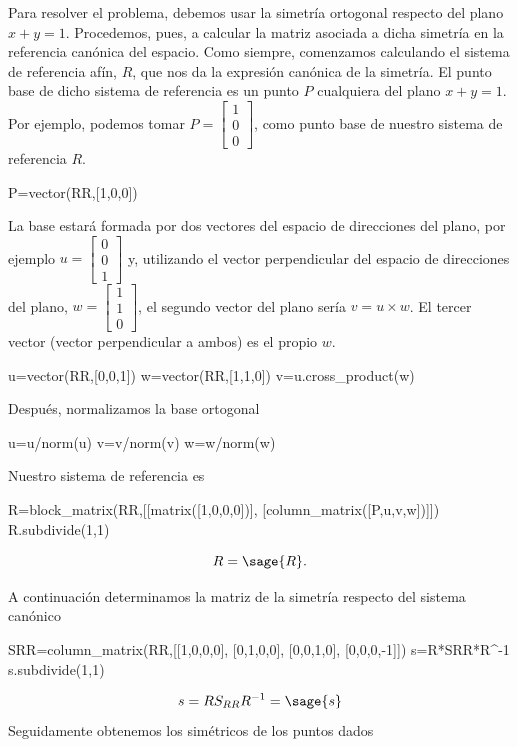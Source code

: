\documentclass{amsart}
\begin{document}
Para resolver el problema, debemos usar la simetría ortogonal respecto del plano  $x+y=1$. Procedemos, pues, a calcular la matriz asociada a dicha simetría en la referencia canónica del espacio. Como siempre, comenzamos calculando el sistema de referencia afín, $R$, que nos da la expresión canónica de la simetría. El punto base de dicho sistema de referencia es un punto $P$ cualquiera del plano $x+y=1$. Por ejemplo, podemos tomar  $P = \left[\begin{array}{c}1\\0\\0
\end{array}\right]$, como punto base de nuestro sistema de referencia $R$.
\begin{sageblock}
P=vector(RR,[1,0,0])
\end{sageblock}
La base estará formada por dos vectores del espacio de direcciones del plano, por ejemplo $u = \left[\begin{array}{c}0\\0\\1
\end{array}\right]$ y, utilizando el vector perpendicular del espacio de direcciones del plano, $w = \left[\begin{array}{c}1\\1\\0 \end{array}\right]$, el segundo vector del plano sería $v=u\times w $. El tercer vector (vector perpendicular a ambos) es el propio $w$. 
\begin{sageblock}
u=vector(RR,[0,0,1])
w=vector(RR,[1,1,0])
v=u.cross_product(w)
\end{sageblock}
Después, normalizamos la base ortogonal
\begin{sageblock}
u=u/norm(u)
v=v/norm(v)
w=w/norm(w)
\end{sageblock}
Nuestro sistema de referencia es
\begin{sageblock}
R=block_matrix(RR,[[matrix([1,0,0,0])],
                  [column_matrix([P,u,v,w])]])
R.subdivide(1,1)
\end{sageblock}
 \[ R = \sage{R}.\] 

A continuación determinamos la matriz de la simetría respecto del sistema canónico

\begin{sageblock}
SRR=column_matrix(RR,[[1,0,0,0],
                   [0,1,0,0],
                   [0,0,1,0],
                   [0,0,0,-1]])
s=R*SRR*R^-1
s.subdivide(1,1)
\end{sageblock}
$$s=RS_{RR}R^{-1}=\sage{s}$$
Seguidamente obtenemos los simétricos de los puntos dados
\end{document}
